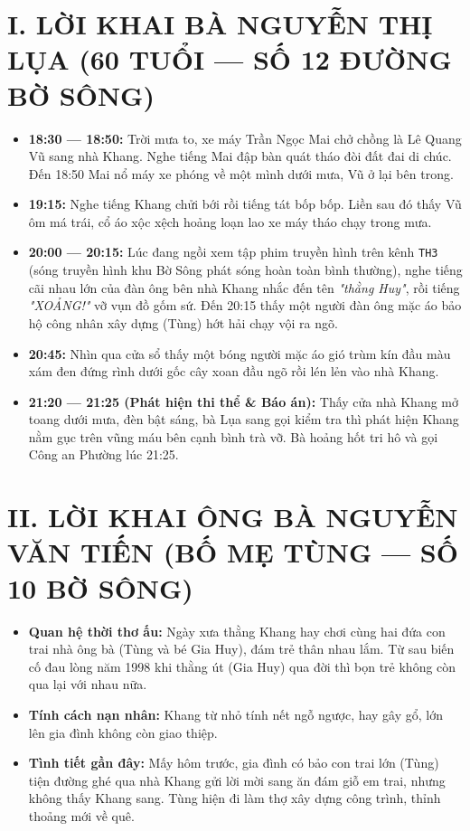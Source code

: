 \documentclass[12pt,a4paper]{article}
\begin{document}
\section*{I. LỜI KHAI BÀ NGUYỄN THỊ LỤA (60 TUỔI — SỐ 12 ĐƯỜNG BỜ SÔNG)}
\begin{itemize}[leftmargin=1.5cm]
    \item \textbf{18:30 — 18:50:} Trời mưa to, xe máy Trần Ngọc Mai chở chồng là Lê Quang Vũ sang nhà Khang. Nghe tiếng Mai đập bàn quát tháo đòi đất đai di chúc. Đến 18:50 Mai nổ máy xe phóng về một mình dưới mưa, Vũ ở lại bên trong.
    \item \textbf{19:15:} Nghe tiếng Khang chửi bới rồi tiếng tát bốp bốp. Liền sau đó thấy Vũ ôm má trái, cổ áo xộc xệch hoảng loạn lao xe máy tháo chạy trong mưa.
    \item \textbf{20:00 — 20:15:} Lúc đang ngồi xem tập phim truyền hình trên kênh \texttt{TH3} (sóng truyền hình khu Bờ Sông phát sóng hoàn toàn bình thường), nghe tiếng cãi nhau lớn của đàn ông bên nhà Khang nhắc đến tên \textit{"thằng Huy"}, rồi tiếng \textit{"XOẢNG!"} vỡ vụn đồ gốm sứ. Đến 20:15 thấy một người đàn ông mặc áo bảo hộ công nhân xây dựng (Tùng) hớt hải chạy vội ra ngõ.
    \item \textbf{20:45:} Nhìn qua cửa sổ thấy một bóng người mặc áo gió trùm kín đầu màu xám đen đứng rình dưới gốc cây xoan đầu ngõ rồi lén lẻn vào nhà Khang.
    \item \textbf{21:20 — 21:25 (Phát hiện thi thể \& Báo án):} Thấy cửa nhà Khang mở toang dưới mưa, đèn bật sáng, bà Lụa sang gọi kiểm tra thì phát hiện Khang nằm gục trên vũng máu bên cạnh bình trà vỡ. Bà hoảng hốt tri hô và gọi Công an Phường lúc 21:25.
\end{itemize}

\section*{II. LỜI KHAI ÔNG BÀ NGUYỄN VĂN TIẾN (BỐ MẸ TÙNG — SỐ 10 BỜ SÔNG)}
\begin{itemize}[leftmargin=1.5cm]
    \item \textbf{Quan hệ thời thơ ấu:} Ngày xưa thằng Khang hay chơi cùng hai đứa con trai nhà ông bà (Tùng và bé Gia Huy), đám trẻ thân nhau lắm. Từ sau biến cố đau lòng năm 1998 khi thằng út (Gia Huy) qua đời thì bọn trẻ không còn qua lại với nhau nữa.
    \item \textbf{Tính cách nạn nhân:} Khang từ nhỏ tính nết ngỗ ngược, hay gây gổ, lớn lên gia đình không còn giao thiệp.
    \item \textbf{Tình tiết gần đây:} Mấy hôm trước, gia đình có bảo con trai lớn (Tùng) tiện đường ghé qua nhà Khang gửi lời mời sang ăn đám giỗ em trai, nhưng không thấy Khang sang. Tùng hiện đi làm thợ xây dựng công trình, thỉnh thoảng mới về quê.
\end{itemize}
\end{document}
